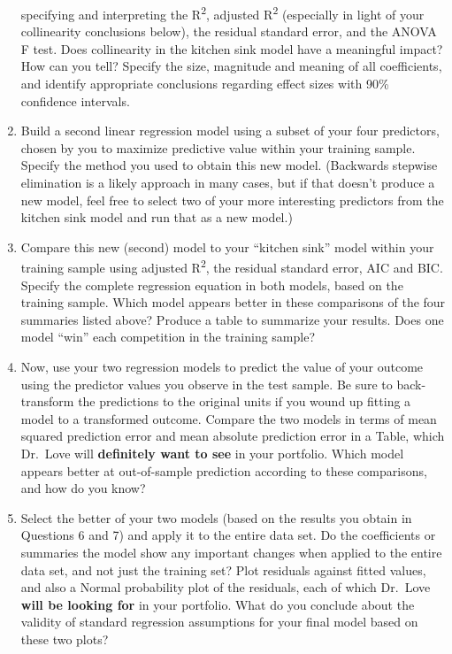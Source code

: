 \documentclass[]{book}
\theoremstyle{definition}
\theoremstyle{definition}
\theoremstyle{definition}
\theoremstyle{remark}
\begin{document}
\begin{enumerate}
  specifying and interpreting the R\textsuperscript{2}, adjusted
  R\textsuperscript{2} (especially in light of your collinearity
  conclusions below), the residual standard error, and the ANOVA F test.
  Does collinearity in the kitchen sink model have a meaningful impact?
  How can you tell? Specify the size, magnitude and meaning of all
  coefficients, and identify appropriate conclusions regarding effect
  sizes with 90\% confidence intervals.
\item
  Build a second linear regression model using a subset of your four
  predictors, chosen by you to maximize predictive value within your
  training sample. Specify the method you used to obtain this new model.
  (Backwards stepwise elimination is a likely approach in many cases,
  but if that doesn't produce a new model, feel free to select two of
  your more interesting predictors from the kitchen sink model and run
  that as a new model.)
\item
  Compare this new (second) model to your ``kitchen sink'' model within
  your training sample using adjusted R\textsuperscript{2}, the residual
  standard error, AIC and BIC. Specify the complete regression equation
  in both models, based on the training sample. Which model appears
  better in these comparisons of the four summaries listed above?
  Produce a table to summarize your results. Does one model ``win'' each
  competition in the training sample?
\item
  Now, use your two regression models to predict the value of your
  outcome using the predictor values you observe in the test sample. Be
  sure to back-transform the predictions to the original units if you
  wound up fitting a model to a transformed outcome. Compare the two
  models in terms of mean squared prediction error and mean absolute
  prediction error in a Table, which Dr.~Love will \textbf{definitely
  want to see} in your portfolio. Which model appears better at
  out-of-sample prediction according to these comparisons, and how do
  you know?
\item
  Select the better of your two models (based on the results you obtain
  in Questions 6 and 7) and apply it to the entire data set. Do the
  coefficients or summaries the model show any important changes when
  applied to the entire data set, and not just the training set? Plot
  residuals against fitted values, and also a Normal probability plot of
  the residuals, each of which Dr.~Love \textbf{will be looking for} in
  your portfolio. What do you conclude about the validity of standard
  regression assumptions for your final model based on these two plots?
\end{enumerate}
\end{document}
